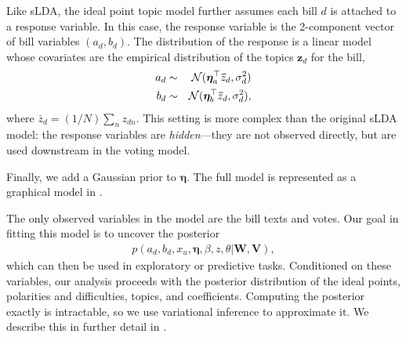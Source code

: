 


Like sLDA, the ideal point topic model further assumes each bill
$d$ is attached to a response variable.  In this case, the
response variable is the 2-component vector of bill variables $(a_d,
b_d)$.  The distribution of the response is a linear model whose
covariates are the empirical distribution of the topics $\bm z_d$ for the
bill,
\begin{eqnarray*}
  a_d &\sim& {\cal N}(\bm \eta_a^\top \bm \bar{z}_d, \sigma_d^2) \nonumber \\
  b_d &\sim& {\cal N}(\bm \eta_b^\top \bm \bar{z}_d, \sigma_d^2), \nonumber \\
\end{eqnarray*}
where $\bar{z}_d = (1/N) \sum_n z_{dn}$.  This setting is more complex
than the original sLDA model: the response variables are
\textit{hidden}---they are not observed directly, but are used
downstream in the voting model.

Finally, we add a Gaussian prior to $\bm \eta$.  The full model is
represented as a graphical model in .

The only observed variables in the model are the bill texts and votes.
Our goal in fitting this model is to uncover the posterior
\begin{align}
  p(a_d, b_d, x_u, \bm \eta, \beta, z, \theta | \bm W, \bm V), \label{eq:posterior}
\end{align}
which can then be used in exploratory or predictive tasks.
Conditioned on these variables, our analysis proceeds with the
posterior distribution of the ideal points, polarities and
difficulties, topics, and coefficients. Computing the posterior exactly
is intractable, so we use variational inference to approximate it.  We
describe this in further detail in .


